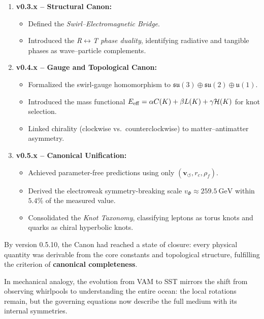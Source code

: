 \documentclass[10pt,reprint,aps,onecolumn,nofootinbib]{revtex4-2}
\newcommand{\vswirl}{\mathbf{v}_{\!\boldsymbol{\circlearrowleft}}}
\newcommand{\rhof}{\rho_{\!f}}                           %
\newcommand{\rc}{r_c}                                    %
\providecommand{\rc}{r_c}
\begin{document}
        \begin{enumerate}
            \item \textbf{v0.3.x -- Structural Canon:}
            \begin{itemize}
                \item Defined the \emph{Swirl--Electromagnetic Bridge}.
                \item Introduced the \emph{R$\leftrightarrow$T phase duality}, identifying radiative and tangible phases as wave--particle complements.
            \end{itemize}

            \item \textbf{v0.4.x -- Gauge and Topological Canon:}
            \begin{itemize}
                \item Formalized the swirl-gauge homomorphism to $\mathfrak{su}(3)\oplus\mathfrak{su}(2)\oplus\mathfrak{u}(1)$.
                \item Introduced the mass functional $E_{\rm eff}=\alpha C(K)+\beta L(K)+\gamma \mathcal{H}(K)$ for knot selection.
                \item Linked chirality (clockwise vs.\ counterclockwise) to matter--antimatter asymmetry.
            \end{itemize}

            \item \textbf{v0.5.x -- Canonical Unification:}
            \begin{itemize}
                \item Achieved parameter-free predictions using only $(\vswirl,\rc,\rhof)$.
                \item Derived the electroweak symmetry-breaking scale $v_\Phi\approx259.5~\text{GeV}$ within $5.4\%$ of the measured value.
                \item Consolidated the \emph{Knot Taxonomy}, classifying leptons as torus knots and quarks as chiral hyperbolic knots.
            \end{itemize}
        \end{enumerate}

        By version 0.5.10, the Canon had reached a state of closure: every physical quantity was derivable from the core constants and topological structure, fulfilling the criterion of \textbf{canonical completeness}.

        \begin{tcolorbox}[colback=gray!5,colframe=black,title={Summary Analogy}]
            In mechanical analogy, the evolution from VAM to SST mirrors the shift from observing whirlpools to understanding the entire ocean: the local rotations remain, but the governing equations now describe the full medium with its internal symmetries.
        \end{tcolorbox}
\end{document}
